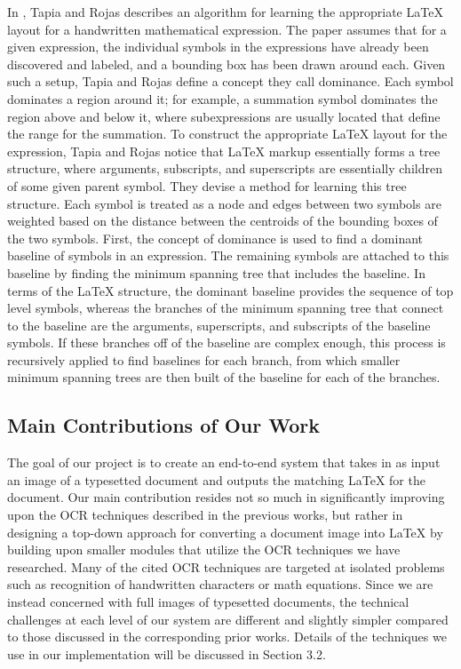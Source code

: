 \documentclass[12pt]{IEEEtran}
\newcommand{\latex}{\LaTeX\xspace}
\begin{document}
In \cite{4}, Tapia and Rojas describes an algorithm for learning the appropriate \latex layout for a handwritten mathematical expression. The paper assumes that for a given expression, the individual symbols in the expressions have already been discovered and labeled, and a bounding box has been drawn around each. Given such a setup, Tapia and Rojas define a concept they call dominance. Each symbol dominates a region around it; for example, a summation symbol dominates the region above and below it, where subexpressions are usually located that define the range for the summation. To construct the appropriate \latex layout for the expression, Tapia and Rojas notice that \latex markup essentially forms a tree structure, where arguments, subscripts, and superscripts are essentially children of some given parent symbol. They devise a method for learning this tree structure. Each symbol is treated as a node and edges between two symbols are weighted based on the distance between the centroids of the bounding boxes of the two symbols. First, the concept of dominance is used to find a dominant baseline of symbols in an expression. The remaining symbols are attached to this baseline by finding the minimum spanning tree that includes the baseline. In terms of the \latex structure, the dominant baseline provides the sequence of top level symbols, whereas the branches of the minimum spanning tree that connect to the baseline are the arguments, superscripts, and subscripts of the baseline symbols. If these branches off of the baseline are complex enough, this process is recursively applied to find baselines for each branch, from which smaller minimum spanning trees are then built of the baseline for each of the branches.   

\subsection{Main Contributions of Our Work}

The goal of our project is to create an end-to-end system that takes in as input an image of a typesetted document and outputs the matching \latex for the document. Our main contribution resides not so much in significantly improving upon the OCR techniques described in the previous works, but rather in designing a top-down approach for converting a document image into \latex by building upon smaller modules that utilize the OCR techniques we have researched. Many of the cited OCR techniques are targeted at isolated problems such as recognition of handwritten characters or math equations. Since we are instead concerned with full images of typesetted documents, the technical challenges at each level of our system are different and slightly simpler compared to those discussed in the corresponding prior works. Details of the techniques we use in our implementation will be discussed in Section 3.2.
\end{document}
